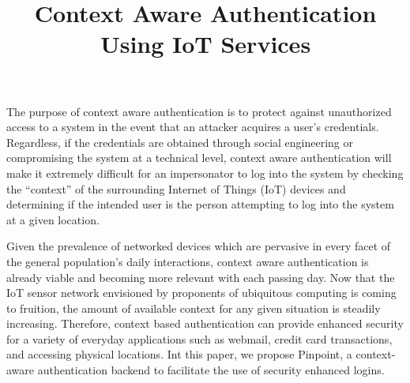 \documentclass[11pt,journal]{IEEEtran}
\begin{document}
\title{Context Aware Authentication Using IoT Services}
\author{
}

\maketitle


The purpose of context aware authentication is to protect against unauthorized access to a system in the event that an attacker acquires a user’s credentials.  Regardless, if the credentials are obtained through social engineering or compromising the system at a technical level, context aware authentication will make it extremely difficult for an impersonator to log into the system by checking the “context” of the surrounding Internet of Things (IoT) devices and determining if the intended user is the person attempting to log into the system at a given location.  

Given the prevalence of networked devices which are pervasive in every facet of the general population's daily interactions, context aware authentication is already viable and becoming more relevant with each passing day. Now that the IoT sensor network envisioned by proponents of ubiquitous computing is coming to fruition, the amount of available context for any given situation is steadily increasing.  Therefore, context based authentication can provide enhanced security for a variety of everyday applications such as webmail, credit card transactions, and accessing physical locations. Int this paper, we propose Pinpoint, a context-aware authentication backend to facilitate the use of security enhanced logins.
\end{document}
